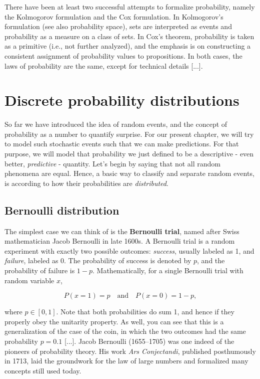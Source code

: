 \documentclass{book}
\begin{document}
There have been at least two successful attempts to formalize probability, namely the Kolmogorov formulation and the Cox formulation. In Kolmogorov's formulation (see also probability space), sets are interpreted as events and probability as a measure on a class of sets. In Cox's theorem, probability is taken as a primitive (i.e., not further analyzed), and the emphasis is on constructing a consistent assignment of probability values to propositions. In both cases, the laws of probability are the same, except for technical details [...].\\

\newpage

\section{Discrete probability distributions}

So far we have introduced the idea of random events, and the concept of probability as a number to quantify surprise. For our present chapter, we will try to model such stochastic events such that we can make predictions. For that purpose, we will model that probability we just defined to be a descriptive - even better, \textit{predictive} - quantity. Let's begin by saying that not all random phenomena are equal. Hence, a basic way to classify and separate random events, is according to how their probabilities are \textit{distributed}.
 
 \subsection{Bernoulli distribution}

The simplest case we can think of is the \textbf{Bernoulli trial}, named after Swiss mathematician Jacob Bernoulli in late 1600s. A Bernoulli trial is a random experiment with exactly two possible outcomes: \textit{success}, usually labeled as 1, and \textit{failure}, labeled as 0. The probability of success is denoted by $p$, and the probability of failure is $1 - p$.
Mathematically, for a single Bernoulli trial with random variable $x$,

\begin{equation}
P(x = 1) = p \quad \text{and} \quad P(x = 0) = 1 - p,
\end{equation}

where $p \in [0, 1]$. Note that both probabilities do sum 1, and hence if they properly obey the unitarity property. As well, you can see that this is a generalization of the case of the coin, in which the two outcomes had the same probability $p = 0.1$ [...]. Jacob Bernoulli (1655–1705) was one indeed of the pioneers of probability theory. His work \textit{Ars Conjectandi}, published posthumously in 1713, laid the groundwork for the law of large numbers and formalized many concepts still used today.
\end{document}
